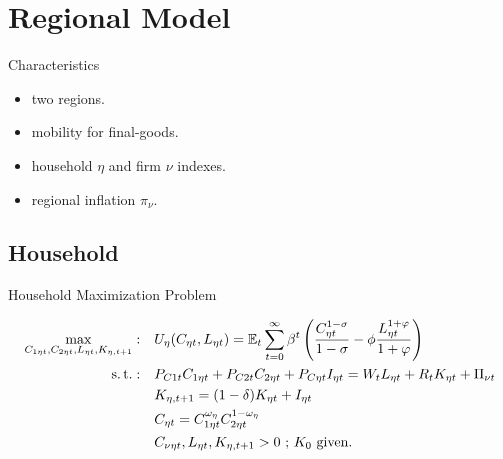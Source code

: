 \documentclass[
presentation.tex
]{subfiles}
\begin{document}
\section{Regional Model}


\begin{frame}{Characteristics}
	
	\begin{itemize}
		
		\item two regions.
		
		\item mobility for final-goods.
		
		\item household $\eta$ and firm $\nu$ indexes.
		
		\item regional inflation $\pi_{\nu}$.
		
	\end{itemize}
	
\end{frame}


\subsection{Household}

\begin{frame}{Household Maximization Problem}
	
\begin{align}
	\max_{C_{1\eta t}, C_{2\eta t}, L_{\eta t},K_{\eta, t+1}}: \quad & U_{\eta}(C_{\eta t},L_{\eta t}) = {\mathbb{E}_{t}} \sum_{t=0}^{\infty} \beta^t \left(\frac{C_{\eta t}^{1-\sigma}}{1-\sigma} - \phi \frac{L_{\eta t}^{1+\varphi}}{1+\varphi} \right) \label{eq:reg-utility-function-0} \\
	\operatorname{s.t.}: \quad & P_{C1t} C_{1\eta t} + P_{C2t} C_{2\eta t} + P_{C\eta t} I_{\eta t} = W_t L_{\eta t} + R_t K_{\eta t} + \Pi_{\nu t} \label{eq:reg-budget-constraint} \\
	\quad & K_{\eta, t+1} = (1-\delta)K_{\eta t} + I_{\eta t} \label{eq:reg-law-of-motion-for-capital} \\
	\quad & C_{\eta t} = C_{1\eta t}^{\omega_{\eta}} C_{2\eta t}^{1-\omega_{\eta}} \label{eq:reg-consumption-aggregation} \\
	\quad & C_{\nu\eta t}, L_{\eta t}, K_{\eta, t+1} > 0 \text{ ; $K_0$ given.} \nonumber
\end{align}
	
\end{frame}
\end{document}
